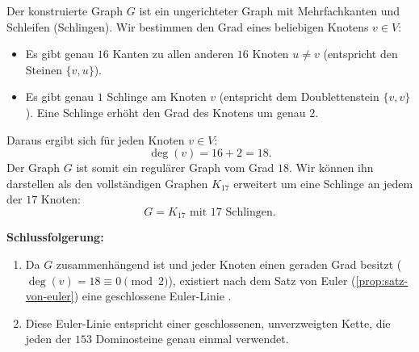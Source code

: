 \begin{math-stroke}
\begin{ai-global-state-checkpoint-invisible-content}
\end{ai-global-state-checkpoint-invisible-content}

Der konstruierte Graph $G$ ist ein ungerichteter Graph mit Mehrfachkanten und Schleifen (Schlingen). Wir bestimmen den Grad eines beliebigen Knotens $v \in V$:
\begin{itemize}
    \item Es gibt genau $16$ Kanten zu allen anderen $16$ Knoten $u \neq v$ (entspricht den Steinen $\{v, u\}$).
    \item Es gibt genau $1$ Schlinge am Knoten $v$ (entspricht dem Doublettenstein $\{v, v\}$). Eine Schlinge erhöht den Grad des Knotens um genau $2$.
\end{itemize}
Daraus ergibt sich für jeden Knoten $v \in V$:
\[
\deg(v) = 16 + 2 = 18.
\]
Der Graph $G$ ist somit ein regulärer Graph vom Grad $18$. Wir können ihn darstellen als den vollständigen Graphen $K_{17}$ erweitert um eine Schlinge an jedem der $17$ Knoten:
\[
G = K_{17} \text{ mit } 17 \text{ Schlingen.}
\]

\textbf{Schlussfolgerung:}
\begin{enumerate}[label=\textbf{(\arabic*)}]
    \item Da $G$ zusammenhängend ist und jeder Knoten einen geraden Grad besitzt ($\deg(v) = 18 \equiv 0 \pmod 2$), existiert nach dem Satz von Euler (\cref{prop:satz-von-euler}) eine geschlossene Euler-Linie .
    \item Diese Euler-Linie entspricht einer geschlossenen, unverzweigten Kette, die jeden der $153$ Dominosteine genau einmal verwendet.
\end{enumerate}
\end{math-stroke}


